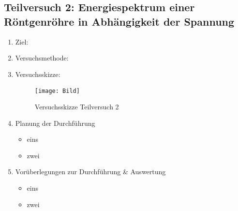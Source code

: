 \documentclass{article}
\begin{document}
\newpage

\subsection{Teilversuch 2: Energiespektrum einer Röntgenröhre in Abhängigkeit der Spannung}
\begin{enumerate}[label = (\Roman*)]
    \item Ziel: 
    
    \item Versuchsmethode: 
    
    \item Versuchsskizze:
    
        \begin{figure}[H]
        \centering
        \texttt{[image: Bild]}
        \caption{Versuchsskizze Teilversuch 2}
        \end{figure}

    \item Planung der Durchführung
        \begin{itemize}
           \item eins
           \item zwei
        \end{itemize}

    \item Vorüberlegungen zur Durchführung \& Auswertung
        \begin{itemize}
            \item eins
            \item zwei
        \end{itemize}
        
\end{enumerate}


\newpage
\end{document}
